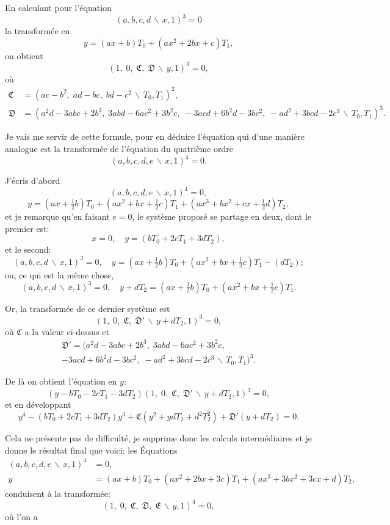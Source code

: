 \documentclass[11pt,a4paper]{book}
\begin{document}
En calculant pour l'\'{e}quation
\[(a,b,c,d\,\backslash\!\!\,x,1)^{3} = 0\]
la transform\'{e}e en
\[y = (ax+b)T_{0} + (ax^{2}+2bx+c)T_{1},\]
on obtient
\[(1,\; 0,\; \mathfrak{C},\; \mathfrak{D}\,\backslash\!\!\,y,1)^{3} = 0,\]
o\`{u}
\begin{align*}
\mathfrak{C} &= (ac-b^{2},\; ad-bc,\; bd-c^{2}\,\backslash\!\!\,T_{0},T_{1})^{2},\\
\mathfrak{D} &= (a^{2}d-3abc+2b^{3},\; 3abd-6ac^{2}+3b^{2}c,\; -3acd+6b^{2}d-3bc^{2},\; -ad^{2}+3bcd-2c^{3}\,\backslash\!\!\,T_{0},T_{1})^{3}.
\end{align*}

Je vais me servir de cette formule, pour en d\'{e}duire l'\'{e}quation qui d'une mani\`{e}re
analogue est la transform\'{e}e de l'\'{e}quation du quatri\`{e}me ordre
\[(a,b,c,d,e\,\backslash\!\!\,x,1)^{4} = 0.\]

J'\'{e}cris d'abord
\[(a,b,c,d,e\,\backslash\!\!\,x,1)^{4} = 0,\]
\[y = (ax+\tfrac{1}{2}b)T_{0} + (ax^{2}+bx+\tfrac{1}{2}c)T_{1} + (ax^{3}+bx^{2}+cx+\tfrac{1}{2}d)T_{2},\]
et je remarque qu'en faisant $e=0$, le syst\`{e}me propos\'{e} se partage en deux, dont
le premier est:
\[x = 0, \quad y = (bT_{0}+2cT_{1}+3dT_{2}),\]
et le second:
\[(a,b,c,d\,\backslash\!\!\,x,1)^{3} = 0, \quad y = (ax+\tfrac{1}{2}b)T_{0} + (ax^{2}+bx+\tfrac{1}{2}c)T_{1} - (dT_{2});\]
ou, ce qui est la m\^{e}me chose,
\[(a,b,c,d\,\backslash\!\!\,x,1)^{3} = 0, \quad y + dT_{2} = (ax+\tfrac{1}{2}b)T_{0} + (ax^{2}+bx+\tfrac{1}{2}c)T_{1}.\]

Or, la transform\'{e}e de ce dernier syst\`{e}me est
\[(1,\; 0,\; \mathfrak{C},\; \mathfrak{D}'\,\backslash\!\!\,y+dT_{2},1)^{3} = 0,\]
o\`{u} $\mathfrak{C}$ a la valeur ci-dessus et
\begin{multline*}
\mathfrak{D}' = (a^{2}d-3abc+2b^{3},\; 3abd-6ac^{2}+3b^{2}c, \\
-3acd+6b^{2}d-3bc^{2},\; -ad^{2}+3bcd-2c^{3}\,\backslash\!\!\,T_{0},T_{1})^{3}.
\end{multline*}

De l\`{a} on obtient l'\'{e}quation en $y$:
\[(y-bT_{0}-2cT_{1}-3dT_{2})(1,\; 0,\; \mathfrak{C},\; \mathfrak{D}'\,\backslash\!\!\,y+dT_{2},1)^{3} = 0,\]
et en d\'{e}veloppant
\[y^{4} - (bT_{0}+2cT_{1}+3dT_{2})y^{3} + \mathfrak{C}(y^{2}+ydT_{2}+d^{2}T_{2}^{2}) + \mathfrak{D}'(y+dT_{2}) = 0.\]

Cela ne pr\'{e}sente pas de difficult\'{e}, je supprime donc les calculs interm\'{e}diaires
et je donne le r\'{e}sultat final que voici: les \'{E}quations
\begin{align*}
(a,b,c,d,e\,\backslash\!\!\,x,1)^{4} &= 0,\\
y &= (ax+b)T_{0} + (ax^{2}+2bx+3c)T_{1} + (ax^{3}+3bx^{2}+3cx+d)T_{2},
\end{align*}
conduisent \`{a} la transform\'{e}e:
\[(1,\; 0,\; \mathfrak{C},\; \mathfrak{D},\; \mathfrak{E}\,\backslash\!\!\,y,1)^{4} = 0,\]
o\`{u} l'on a
\end{document}
